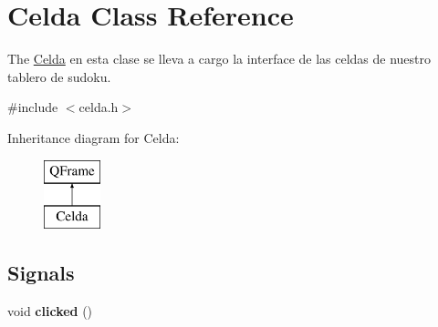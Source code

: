 \hypertarget{class_celda}{\section{Celda Class Reference}
\label{class_celda}
}


The \hyperlink{class_celda}{Celda} en esta clase se lleva a cargo la interface de las celdas de nuestro tablero de sudoku.  




{\ttfamily \#include $<$celda.\-h$>$}

Inheritance diagram for Celda\-:\begin{figure}[H]
\begin{center}
\leavevmode
\includegraphics[height=2.000000cm]{class_celda}
\end{center}
\end{figure}
\subsection*{Signals}
\begin{DoxyCompactItemize}
\item 
\hypertarget{class_celda_a7f23df77ebd6ac50edb1e46101d2734a}{void {\bfseries clicked} ()}\label{class_celda_a7f23df77ebd6ac50edb1e46101d2734a}

\end{DoxyCompactItemize}
